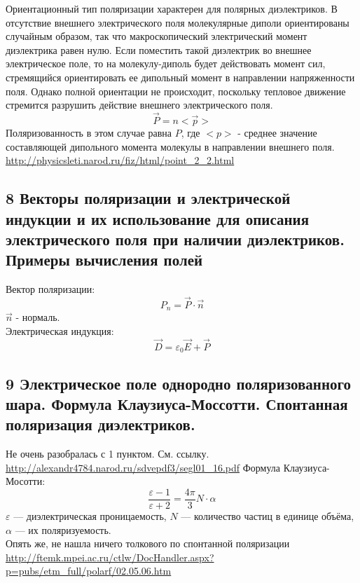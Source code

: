 \documentclass[a4paper,12pt]{article}
\begin{document}
Ориентационный тип поляризации характерен для полярных диэлектриков. В отсутствие внешнего электрического поля молекулярные диполи ориентированы случайным образом, так что макроскопический электрический момент диэлектрика равен нулю. Если поместить такой диэлектрик во внешнее электрическое поле, то на молекулу-диполь будет действовать момент сил, стремящийся ориентировать ее дипольный момент в направлении напряженности поля. Однако полной ориентации не происходит, поскольку тепловое движение стремится разрушить действие внешнего электрического поля.\\
\begin{equation}
	\vec{P} = n <\vec{p}>
\end{equation}
Поляризованность в этом случае равна $P$, где $<p>$ - среднее значение составляющей дипольного момента молекулы в направлении внешнего поля.\\
\url{http://physicsleti.narod.ru/fiz/html/point_2_2.html}

\subsection{8   Векторы поляризации и электрической индукции и их использование для описания электрического поля при наличии диэлектриков. Примеры вычисления полей}
Вектор поляризации:\\
\begin{equation}
	P_n = \vec{P} \cdot \vec{n}
\end{equation}
$\vec{n}$ - нормаль.\\
Электрическая индукция:\\
\begin{equation}
	\vec{D} = \varepsilon _0 \vec{E} + \vec{P}
\end{equation}

\subsection{9   Электрическое поле однородно поляризованного шара. Формула Клаузиуса-Моссотти. Спонтанная поляризация диэлектриков.}
Не очень разобралась с 1 пунктом. См. ссылку.\\
\url{http://alexandr4784.narod.ru/sdvepdf3/segl01_16.pdf}
Формула Клаузиуса-Мосотти:\\
\begin{equation}
	\frac{\varepsilon - 1}{\varepsilon + 2} = \frac{4 \pi}{3} N \cdot \alpha
\end{equation}
$\varepsilon$ — диэлектрическая проницаемость, $N$ — количество частиц в единице объёма, $\alpha$ — их поляризуемость.\\
Опять же, не нашла ничего толкового по спонтанной поляризации\\
\url{http://ftemk.mpei.ac.ru/ctlw/DocHandler.aspx?p=pubs/etm_full/polarf/02.05.06.htm}
\end{document}
